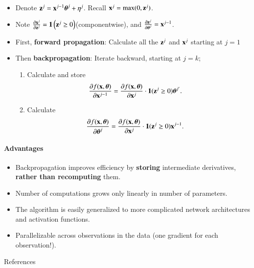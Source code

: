 \documentclass[notes, ignorenonframetext, compress, 10pt, xcolor=svgnames, aspectratio=169]{beamer}
\begin{document}
\begin{frame}[allowframebreaks]{\insertsection}
\begin{itemize}
\item Denote ${\mathbf z}^j = {\mathbf x}^{j-1}{\boldsymbol \theta}^j+\eta^j$. Recall ${\mathbf x}^j= \max(0,{\mathbf z}^j)$.
\item Note $\frac{\partial {\mathbf x}^j}{\partial {\mathbf z}^j} = \mathbf{1}\left({\mathbf z}^j \geq 0 \right)$(componentwise), and $\frac{\partial {\mathbf z}^j}{\partial{\boldsymbol \theta}^j} = {\mathbf x}^{j-1}$.
\item First, \textbf{forward propagation}:
Calculate all the ${\mathbf z}^j$ and ${\mathbf x}^j$
starting at $ j = 1$
\item Then \textbf{backpropagation}:
Iterate backward, starting at $ j = k$;
\begin{enumerate}
\item Calculate and store
\begin{align*}
\frac{\partial f({\mathbf x}, {\boldsymbol \theta})}{\partial {\mathbf x}^{j-1}}&=\frac{\partial f({\mathbf x}, {\boldsymbol \theta})}{\partial{\mathbf x}^j}\cdot\mathbf{1}({\mathbf z}^j\geq 0){\boldsymbol \theta}^{j^\prime}.
\end{align*}
\item Calculate
\begin{align*}
\frac{\partial f({\mathbf x}, {\boldsymbol \theta})}{\partial {\boldsymbol \theta}^j}&=\frac{\partial f({\mathbf x}, {\boldsymbol \theta})}{\partial {\mathbf x}^j}\cdot\mathbf{1}({\mathbf z}^j\geq 0){\mathbf x}^{j-1}.
\end{align*}
\end{enumerate}
\end{itemize}
\end{frame}

\begin{frame}[allowframebreaks]{\insertsection}
\framesubtitle{Advantages}
\begin{itemize}
\item Backpropagation improves efficiency by \textbf{storing} intermediate derivatives,
\textbf{rather than recomputing} them.
\item Number of computations grows only linearly in number of parameters.
\item The algorithm is easily generalized to more complicated network architectures
and activation functions.
\item Parallelizable across observations in the data (one gradient for each
observation!).

\end{itemize}
\end{frame}
\begin{frame}[allowframebreaks]{References}


\end{frame}
\end{document}
